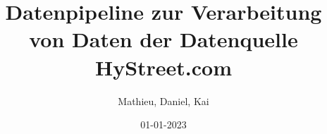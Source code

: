 \documentclass{article}
\title{Datenpipeline zur Verarbeitung von Daten der Datenquelle HyStreet.com} %
\date{01-01-2023}
\author{Mathieu, Daniel, Kai}
\begin{document}
\maketitle
\newpage

\doublespacing
\tableofcontents
\singlespacing

\onehalfspacing
{}



\begin{appendix}
    \listoffigures
    \listoftables
\end{appendix}

\end{document}
